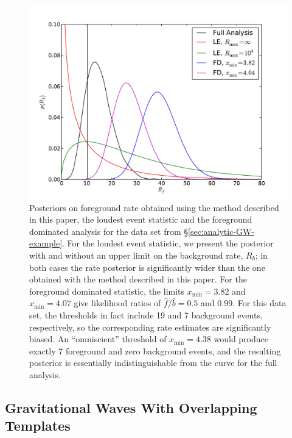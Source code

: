 \documentclass[aps,prd]{revtex4-1}
\begin{document}
\begin{figure}
  \includegraphics[width=\columnwidth]{AltMethodComp}
  \caption{\label{fig:altmeth}Posteriors on foreground rate obtained
    using the method described in this paper, the loudest event
    statistic and the foreground dominated analysis for the data set
    from \S \ref{sec:analytic-GW-example}.  For the loudest event
    statistic, we present the posterior with and without an upper
    limit on the background rate, $R_b$; in both cases the rate
    posterior is significantly wider than the one obtained with the
    method described in this paper.  For the foreground dominated
    statistic, the limits $x_\mathrm{min} = 3.82$ and $x_\mathrm{min}
    = 4.07$ give likelihood ratios of $\hat{f}/\hat{b} = 0.5$ and
    $0.99$.  For this data set, the thresholds in fact include 19 and
    7 background events, respectively, so the corresponding rate
    estimates are significantly biased.  An ``omniscient'' threshold
    of $x_\mathrm{min} = 4.38$ would produce exactly 7 foreground and
    zero background events, and the resulting posterior is essentially
    indistinguishable from the curve for the full analysis.}
\end{figure}

\subsection{Gravitational Waves With Overlapping Templates}
\label{sec:gw-overlapping-template}
\end{document}
